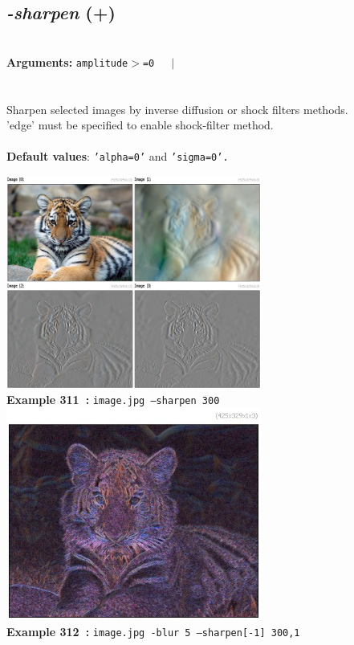 \documentclass[a4paper,11pt,twoside]{book}
\begin{document}
\subsection{\emph{-sharpen} (+)}\vspace*{-0.5em}
~\\\textbf{Arguments: } 
{\small \texttt{amplitude$>$=0}}~~~$|$\\
\\~\\
Sharpen selected images by inverse diffusion or shock filters methods.
~\\'edge' must be specified to enable shock-filter method.
~\\~\\\textbf{Default values}: {\small \texttt{'alpha=0'} and \texttt{'sigma=0'.}}
\begin{center}\includegraphics[keepaspectratio=true,height=7cm,width=\textwidth]{img/gmic_def311.jpg}\\
{\footnotesize \textbf{Example 311~:} \texttt{image.jpg --sharpen 300}}
\\\includegraphics[keepaspectratio=true,height=7cm,width=\textwidth]{img/gmic_def312.jpg}\\
{\footnotesize \textbf{Example 312~:} \texttt{image.jpg -blur 5 --sharpen[-1] 300,1}}
\end{center}
\end{document}
